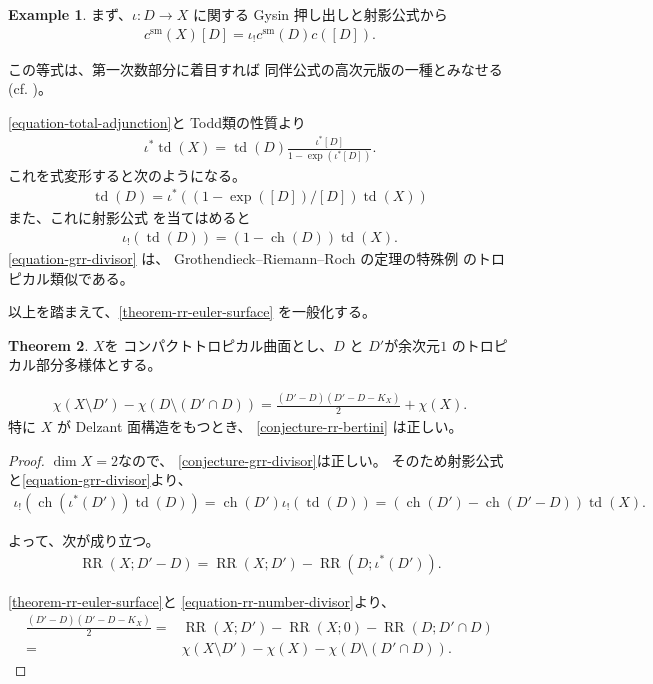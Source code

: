 \documentclass[a4paper,dvipdfmx,reqno,12pt]{amsart}
\theoremstyle{definition}
\newtheorem{theorem}{Theorem}[section]
\newtheorem{example}[theorem]{Example}
\newcommand{\opn}[1]{\operatorname{#1}}
\numberwithin{equation}{section}
\begin{document}
\begin{example}
     

まず、$\iota\colon D\to X$ に関する
Gysin 押し出しと射影公式から
\begin{align}
c^{\mathrm{sm}}(X)[D]=\iota_!c^{\mathrm{sm}}(D)c([D]).
\end{align}

この等式は、第一次数部分に着目すれば
同伴公式の高次元版の一種とみなせる
(cf. \cite[Theorem 5.2]{demedrano2023chern})。

\eqref{equation-total-adjunction}と
Todd類の性質より
\begin{align}
\iota^{*}\opn{td}(X)=
\opn{td}(D)\frac{\iota^{*}[D]}{1-\opn{exp}(\iota^{*}[D])}.
\end{align}
これを式変形すると次のようになる。
\begin{align}
\opn{td}(D)
=\iota^{*}((1-\opn{exp}([D])/[D])\opn{td}(X))
\end{align}
また、これに射影公式
\cite[Proposition 4.18]{gross2019sheaftheoretic}
を当てはめると
\begin{align}
\label{equation-grr-divisor}
\iota_!(\opn{td}(D))=(1-\opn{ch}(D))\opn{td}(X).
\end{align}
\eqref{equation-grr-divisor} は、
Grothendieck--Riemann--Roch の定理の特殊例
のトロピカル類似である。

\end{example}

以上を踏まえて、\cref{theorem-rr-euler-surface}
を一般化する。

\begin{theorem}
\label{theorem-rr-bertini-surface}
$X$を
コンパクトトロピカル曲面とし、$D$ と $D'$が余次元$1$
のトロピカル部分多様体とする。

\begin{align}
\chi(X\setminus D')-\chi(D\setminus (D'\cap D))
=\frac{(D'-D)(D'-D-K_X)}{2}+\chi(X).
\end{align}
特に $X$ が Delzant 面構造をもつとき、
\cref{conjecture-rr-bertini} は正しい。
\end{theorem}

\begin{proof}
$\dim X=2$なので、
\cref{conjecture-grr-divisor}は正しい。
そのため射影公式と\eqref{equation-grr-divisor}より、
\begin{align}
\iota_!(\opn{ch}(\iota^{*}(D'))\opn{td}(D))
=\opn{ch}(D')\iota_!(\opn{td}(D))
=(\opn{ch}(D')-\opn{ch}(D'-D))\opn{td}(X).
\end{align}

よって、次が成り立つ。
\begin{align}
\label{equation-rr-number-divisor}
\opn{RR}(X;D'-D)=\opn{RR}(X;D')-
\opn{RR}(D;\iota^{*}(D')).
\end{align}

\cref{theorem-rr-euler-surface}と
\eqref{equation-rr-number-divisor}より、
\begin{align}
\frac{(D'-D)(D'-D-K_X)}{2}=&
\opn{RR}(X;D')-\opn{RR}(X;0)-
\opn{RR}(D;D'\cap D) \\
=&\chi(X\setminus D')-\chi(X)-\chi(D\setminus (D'\cap D)).
\end{align}
\end{proof}
\end{document}
